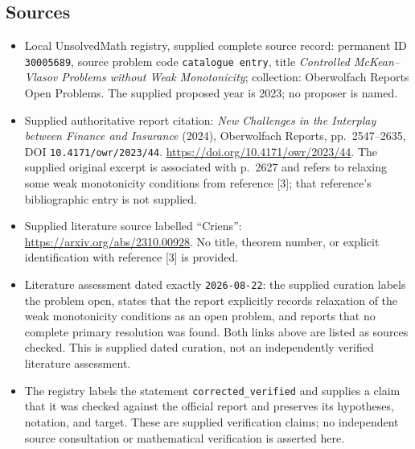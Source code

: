 \documentclass[11pt]{article}
\begin{document}
\subsection{Sources}
\begin{itemize}
\item Local UnsolvedMath registry, supplied complete source record: permanent ID \texttt{30005689}, source problem code \texttt{catalogue entry}, title \emph{Controlled McKean--Vlasov Problems without Weak Monotonicity}; collection: Oberwolfach Reports Open Problems. The supplied proposed year is 2023; no proposer is named.
\item Supplied authoritative report citation: \emph{New Challenges in the Interplay between Finance and Insurance} (2024), Oberwolfach Reports, pp.~2547--2635, DOI \texttt{10.4171/owr/2023/44}. \url{https://doi.org/10.4171/owr/2023/44}. The supplied original excerpt is associated with p.~2627 and refers to relaxing some weak monotonicity conditions from reference [3]; that reference's bibliographic entry is not supplied.
\item Supplied literature source labelled ``Criens'': \url{https://arxiv.org/abs/2310.00928}. No title, theorem number, or explicit identification with reference [3] is provided.
\item Literature assessment dated exactly \texttt{2026-08-22}: the supplied curation labels the problem open, states that the report explicitly records relaxation of the weak monotonicity conditions as an open problem, and reports that no complete primary resolution was found. Both links above are listed as sources checked. This is supplied dated curation, not an independently verified literature assessment.
\item The registry labels the statement \texttt{corrected\_verified} and supplies a claim that it was checked against the official report and preserves its hypotheses, notation, and target. These are supplied verification claims; no independent source consultation or mathematical verification is asserted here.
\end{itemize}
\end{document}
